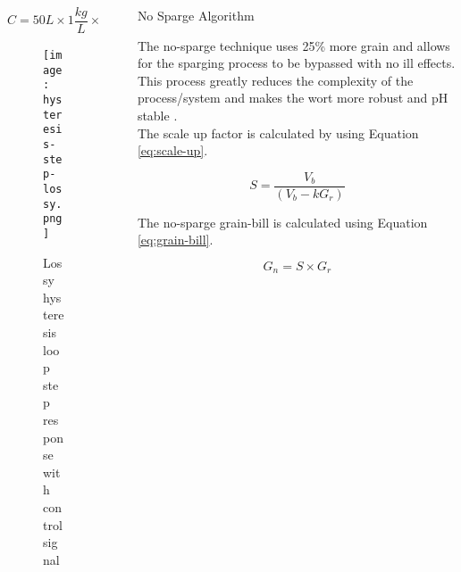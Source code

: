 \documentclass[final]{beamer}
\newlength{\sepwid}
\newlength{\onecolwid}
\newlength{\twocolwid}
\begin{document}
\begin{frame}[t]
\begin{columns}[t]
\begin{column}{\twocolwid}
\begin{columns}[t,totalwidth=\twocolwid]
\begin{column}{\onecolwid}
\begin{equation}
C = 50L \times 1\frac{kg}{L} \times 4200\frac{J}{kgK} = 210,000\frac{J}{K}
\label{eq:value-heat}
\end{equation}

\begin{figure}
\texttt{[image: hysteresis-step-lossy.png]}
\caption{Lossy hysteresis loop step response with control signal}
\end{figure}


\end{column} %

\end{columns} %

\end{column} %

\begin{column}{\sepwid}\end{column} %

\begin{column}{\onecolwid} %


\begin{block}{No Sparge Algorithm}

The no-sparge technique uses 25\% more grain and allows for the sparging process to be bypassed with no ill effects.  This process greatly reduces the complexity of the process/system and makes the wort more robust and pH stable \cite{sparging}. \\

\noindent The scale up factor is calculated by using Equation \ref{eq:scale-up}.

\begin{equation}
S = \frac{V_{b}}{(V_{b} - kG_{r})}
\label{eq:scale-up}
\end{equation}

\noindent The no-sparge grain-bill is calculated using Equation \ref{eq:grain-bill}.

\begin{equation}
G_{n} = S \times G_{r}
\label{eq:grain-bill}
\end{equation}


\end{block}
\end{column}
\end{columns}
\end{frame}
\end{document}
